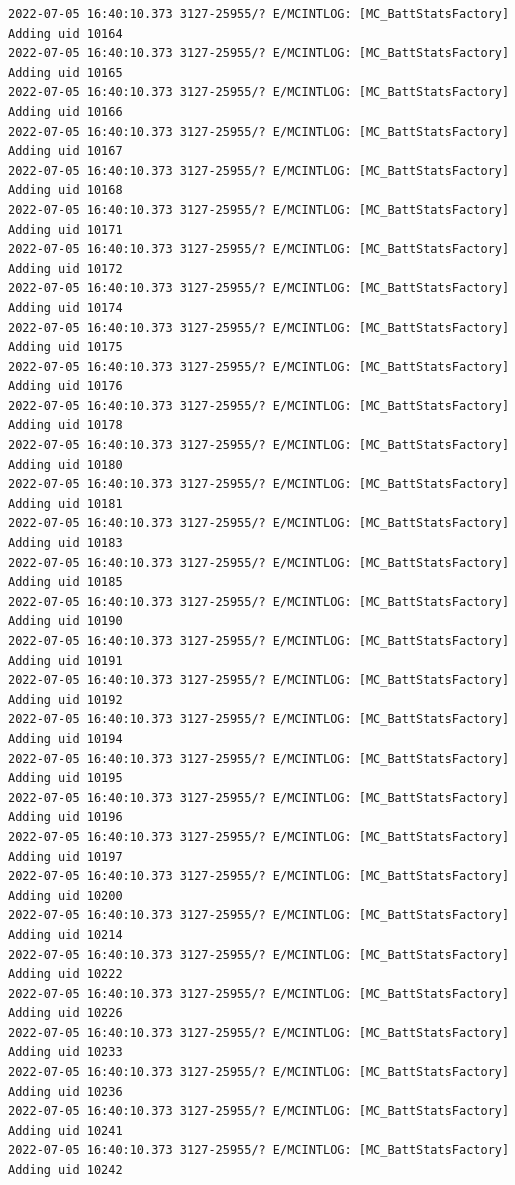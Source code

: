 \documentclass[a4paper,12pt]{book}
\begin{document}
\begin{lstlisting}
2022-07-05 16:40:10.373 3127-25955/? E/MCINTLOG: [MC_BattStatsFactory] Adding uid 10164
2022-07-05 16:40:10.373 3127-25955/? E/MCINTLOG: [MC_BattStatsFactory] Adding uid 10165
2022-07-05 16:40:10.373 3127-25955/? E/MCINTLOG: [MC_BattStatsFactory] Adding uid 10166
2022-07-05 16:40:10.373 3127-25955/? E/MCINTLOG: [MC_BattStatsFactory] Adding uid 10167
2022-07-05 16:40:10.373 3127-25955/? E/MCINTLOG: [MC_BattStatsFactory] Adding uid 10168
2022-07-05 16:40:10.373 3127-25955/? E/MCINTLOG: [MC_BattStatsFactory] Adding uid 10171
2022-07-05 16:40:10.373 3127-25955/? E/MCINTLOG: [MC_BattStatsFactory] Adding uid 10172
2022-07-05 16:40:10.373 3127-25955/? E/MCINTLOG: [MC_BattStatsFactory] Adding uid 10174
2022-07-05 16:40:10.373 3127-25955/? E/MCINTLOG: [MC_BattStatsFactory] Adding uid 10175
2022-07-05 16:40:10.373 3127-25955/? E/MCINTLOG: [MC_BattStatsFactory] Adding uid 10176
2022-07-05 16:40:10.373 3127-25955/? E/MCINTLOG: [MC_BattStatsFactory] Adding uid 10178
2022-07-05 16:40:10.373 3127-25955/? E/MCINTLOG: [MC_BattStatsFactory] Adding uid 10180
2022-07-05 16:40:10.373 3127-25955/? E/MCINTLOG: [MC_BattStatsFactory] Adding uid 10181
2022-07-05 16:40:10.373 3127-25955/? E/MCINTLOG: [MC_BattStatsFactory] Adding uid 10183
2022-07-05 16:40:10.373 3127-25955/? E/MCINTLOG: [MC_BattStatsFactory] Adding uid 10185
2022-07-05 16:40:10.373 3127-25955/? E/MCINTLOG: [MC_BattStatsFactory] Adding uid 10190
2022-07-05 16:40:10.373 3127-25955/? E/MCINTLOG: [MC_BattStatsFactory] Adding uid 10191
2022-07-05 16:40:10.373 3127-25955/? E/MCINTLOG: [MC_BattStatsFactory] Adding uid 10192
2022-07-05 16:40:10.373 3127-25955/? E/MCINTLOG: [MC_BattStatsFactory] Adding uid 10194
2022-07-05 16:40:10.373 3127-25955/? E/MCINTLOG: [MC_BattStatsFactory] Adding uid 10195
2022-07-05 16:40:10.373 3127-25955/? E/MCINTLOG: [MC_BattStatsFactory] Adding uid 10196
2022-07-05 16:40:10.373 3127-25955/? E/MCINTLOG: [MC_BattStatsFactory] Adding uid 10197
2022-07-05 16:40:10.373 3127-25955/? E/MCINTLOG: [MC_BattStatsFactory] Adding uid 10200
2022-07-05 16:40:10.373 3127-25955/? E/MCINTLOG: [MC_BattStatsFactory] Adding uid 10214
2022-07-05 16:40:10.373 3127-25955/? E/MCINTLOG: [MC_BattStatsFactory] Adding uid 10222
2022-07-05 16:40:10.373 3127-25955/? E/MCINTLOG: [MC_BattStatsFactory] Adding uid 10226
2022-07-05 16:40:10.373 3127-25955/? E/MCINTLOG: [MC_BattStatsFactory] Adding uid 10233
2022-07-05 16:40:10.373 3127-25955/? E/MCINTLOG: [MC_BattStatsFactory] Adding uid 10236
2022-07-05 16:40:10.373 3127-25955/? E/MCINTLOG: [MC_BattStatsFactory] Adding uid 10241
2022-07-05 16:40:10.373 3127-25955/? E/MCINTLOG: [MC_BattStatsFactory] Adding uid 10242

\end{lstlisting}
\end{document}
